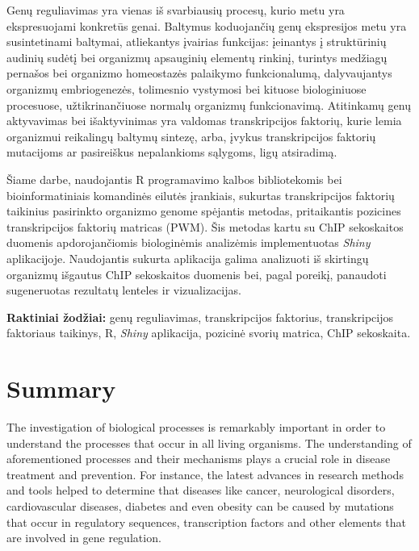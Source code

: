 \documentclass[12pt]{article}
\begin{document}
Genų reguliavimas yra vienas iš svarbiausių procesų, kurio metu yra
ekspresuojami konkretūs genai. Baltymus koduojančių genų ekspresijos metu yra
susintetinami baltymai, atliekantys įvairias funkcijas: įeinantys į struktūrinių
audinių sudėtį bei organizmų apsauginių elementų rinkinį, turintys medžiagų
pernašos bei organizmo homeostazės palaikymo funkcionalumą, dalyvaujantys
organizmų embriogenezės, tolimesnio vystymosi bei kituose biologiniuose
procesuose, užtikrinančiuose normalų organizmų funkcionavimą. Atitinkamų genų
aktyvavimas bei išaktyvinimas yra valdomas transkripcijos faktorių, kurie lemia
organizmui reikalingų baltymų sintezę, arba, įvykus transkripcijos faktorių
mutacijoms ar pasireiškus nepalankioms sąlygoms, ligų atsiradimą.

Šiame darbe, naudojantis R programavimo kalbos bibliotekomis bei
bioinformatiniais komandinės eilutės įrankiais, sukurtas transkripcijos faktorių
taikinius pasirinkto organizmo genome spėjantis metodas, pritaikantis pozicines
transkripcijos faktorių matricas (PWM). Šis metodas kartu su ChIP sekoskaitos
duomenis apdorojančiomis biologinėmis analizėmis implementuotas \emph{Shiny}
aplikacijoje. Naudojantis sukurta aplikacija galima analizuoti iš skirtingų
organizmų išgautus ChIP sekoskaitos duomenis bei, pagal poreikį, panaudoti
sugeneruotas rezultatų lenteles ir vizualizacijas.

\hfill \break
\textbf{Raktiniai žodžiai:} genų reguliavimas, transkripcijos faktorius, 
transkripcijos faktoriaus taikinys, R, \emph{Shiny} aplikacija, pozicinė svorių
matrica, ChIP sekoskaita.

\newpage


\section*{Summary}
The investigation of biological processes is remarkably important in order to
understand the processes that occur in all living organisms. The understanding
of aforementioned processes and their mechanisms plays a crucial role in
disease treatment and prevention. For instance, the latest advances in research
methods and tools helped to determine that diseases like cancer, neurological
disorders, cardiovascular diseases, diabetes and even obesity can be caused
by mutations that occur in regulatory sequences, transcription factors and
other elements that are involved in gene regulation\cite{ARTICLE0}.
\end{document}
